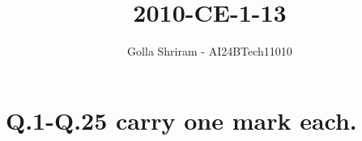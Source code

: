 \documentclass[journal,12pt,twocolumn]{IEEEtran}
\theoremstyle{remark}
\begin{document}


\vspace{3cm}
\title{ 2010-CE-1-13 }
\author{Golla Shriram - AI24BTech11010}

\maketitle

\renewcommand{\thefigure}{\theenumi}
\renewcommand{\thetable}{\theenumi}

\section{ Q.1-Q.25 carry one mark each. }
                                                                           
\end{document}
